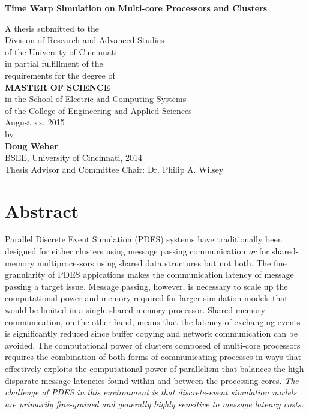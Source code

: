 \documentclass[11pt]{book}
\begin{document}
\thispagestyle{empty}

\doublespacing

\vspace*{0.5in}

\begin{center}
\LARGE{\textbf{Time Warp Simulation on Multi-core Processors and Clusters}}

\vspace*{0.4in}

  {\large A thesis submitted to the\\[0.20in]
    Division of Research and Advanced Studies\\
    of the University of Cincinnati\\[0.20in]
    in partial fulfillment of the\\
    requirements for the degree of\\[0.20in]
    \textbf{MASTER OF SCIENCE}\\[0.20in]
    in the School of Electric and Computing Systems\\
    of the College of Engineering and Applied Sciences\\[0.20in]
    August xx, 2015\\[0.20in]
    by\\[0.20in]
    \textbf{Doug Weber}\\
    BSEE, University of Cincinnati, 2014\\}
  \vspace{0.5in}
  {\large Thesis Advisor and Committee Chair:  Dr. Philip A. Wilsey}
\end{center}

\clearpage

\setcounter{page}{1}
\clearpage

\chapter*{Abstract}

Parallel Discrete Event Simulation (PDES) systems have traditionally been designed for either
clusters using message passing communication \emph{or} for shared-memory multiprocessors using
shared data structures but not both.  The fine granularity of PDES appications makes the
communication latency of message passing a target issue.  Message passing, however, is necessary to
scale up the computational power and memory required for larger simulation models that would be
limited in a single shared-memory processor.  Shared memory communication, on the other hand, means
that the latency of exchanging events is significantly reduced since buffer copying and network
communication can be avoided.  The computational power of clusters composed of multi-core processors
requires the combination of both forms of communicating processes in ways that effectively exploits
the computational power of parallelism that balances the high disparate message latencies found
within and between the processing cores.  \emph{The challenge of PDES in this environment is that
  discrete-event simulation models are primarily fine-grained and generally highly sensitive to
  message latency costs.}
\end{document}
